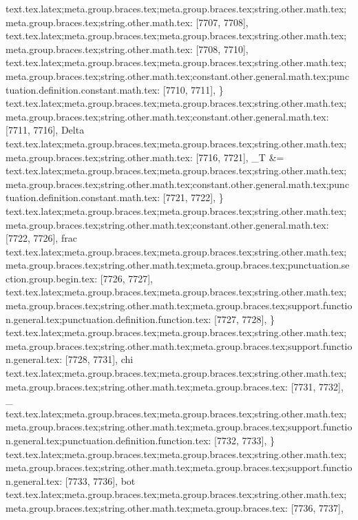 {{{{{{{{{{{{{{{{{{{{{{{{{{{{{{{{{{{{{{{{{{{{{{{{{{{{{{{{{{{{{{{{{{{{{{{{{{{{{{{{{{{{{{{{{{{{{{{{{{{{{{{{{{{{{{{{{{{{{{{{{{{{{{{{{{{{{{{{{{{{{{{{{{{{{{{{{{{{{{{{{{{{{{{{{{{{{{{{{{{{{{{{{{{{{{{{{{{{{{{{{{{{{{{{{{{{{{{{{{{text.tex.latex;meta.group.braces.tex;meta.group.braces.tex;string.other.math.tex;meta.group.braces.tex;string.other.math.tex: [7707, 7708], {
}
text.tex.latex;meta.group.braces.tex;meta.group.braces.tex;string.other.math.tex;meta.group.braces.tex;string.other.math.tex: [7708, 7710], {  }
text.tex.latex;meta.group.braces.tex;meta.group.braces.tex;string.other.math.tex;meta.group.braces.tex;string.other.math.tex;constant.other.general.math.tex;punctuation.definition.constant.math.tex: [7710, 7711], {\}
text.tex.latex;meta.group.braces.tex;meta.group.braces.tex;string.other.math.tex;meta.group.braces.tex;string.other.math.tex;constant.other.general.math.tex: [7711, 7716], {Delta}
text.tex.latex;meta.group.braces.tex;meta.group.braces.tex;string.other.math.tex;meta.group.braces.tex;string.other.math.tex: [7716, 7721], {_T &=}
text.tex.latex;meta.group.braces.tex;meta.group.braces.tex;string.other.math.tex;meta.group.braces.tex;string.other.math.tex;constant.other.general.math.tex;punctuation.definition.constant.math.tex: [7721, 7722], {\}
text.tex.latex;meta.group.braces.tex;meta.group.braces.tex;string.other.math.tex;meta.group.braces.tex;string.other.math.tex;constant.other.general.math.tex: [7722, 7726], {frac}
text.tex.latex;meta.group.braces.tex;meta.group.braces.tex;string.other.math.tex;meta.group.braces.tex;string.other.math.tex;meta.group.braces.tex;punctuation.section.group.begin.tex: [7726, 7727], {{}
text.tex.latex;meta.group.braces.tex;meta.group.braces.tex;string.other.math.tex;meta.group.braces.tex;string.other.math.tex;meta.group.braces.tex;support.function.general.tex;punctuation.definition.function.tex: [7727, 7728], {\}
text.tex.latex;meta.group.braces.tex;meta.group.braces.tex;string.other.math.tex;meta.group.braces.tex;string.other.math.tex;meta.group.braces.tex;support.function.general.tex: [7728, 7731], {chi}
text.tex.latex;meta.group.braces.tex;meta.group.braces.tex;string.other.math.tex;meta.group.braces.tex;string.other.math.tex;meta.group.braces.tex: [7731, 7732], {_}
text.tex.latex;meta.group.braces.tex;meta.group.braces.tex;string.other.math.tex;meta.group.braces.tex;string.other.math.tex;meta.group.braces.tex;support.function.general.tex;punctuation.definition.function.tex: [7732, 7733], {\}
text.tex.latex;meta.group.braces.tex;meta.group.braces.tex;string.other.math.tex;meta.group.braces.tex;string.other.math.tex;meta.group.braces.tex;support.function.general.tex: [7733, 7736], {bot}
text.tex.latex;meta.group.braces.tex;meta.group.braces.tex;string.other.math.tex;meta.group.braces.tex;string.other.math.tex;meta.group.braces.tex: [7736, 7737], { }
}}}}}}}}}}}}}}}}}}}}}}}}}}}}}}}}}}}}}}}}}}}}}}}}}}}}}}}}}}}}}}}}}}}}}}}}}}}}}}}}}}}}}}}}}}}}}}}}}}}}}}}}}}}}}}}}}}}}}}}}}}}}}}}}}}}}}}}}}}}}}}}}}}}}}}}}}}}}}}}}}}}}}}}}}}}}}}}}}}}}}}}}}}}}}}}}}}}}}}}}}}}}}}}}}}}}}}}}}}}}}}}}
